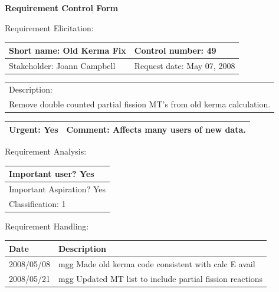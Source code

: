\begin{center}\Large\bf
Requirement Control Form
\end{center}
\vspace{24pt}

Requirement Elicitation:

\begin{tabular}{|p{211pt}|p{211pt}|} \hline
Short name: Old Kerma Fix & Control number: 49\\ \hline
Stakeholder: Joann Campbell & Request date: May 07, 2008\\
\end{tabular}
\begin{tabular}{|p{433pt}|} \hline
Description: \\ 
Remove double counted partial fission MT's from old kerma calculation.\\ 
\hline
\end{tabular} 
\begin{tabular}{|p{211pt}|p{211pt}|} \hline
Urgent: Yes & Comment: Affects many users of new data.\\ \hline
\end{tabular}

\vspace{24pt}

Requirement Analysis:

\begin{tabular}{|p{433pt}|} \hline
Important user? Yes \\ \hline
Important Aspiration? Yes \\ \hline
Classification: 1 \\ \hline
\end{tabular}

\vspace{24pt}

Requirement Handling:

\begin{tabular}{|p{72pt}|p{351pt}|} \hline
Date & Description \\ \hline
2008/05/08 & mgg Made old kerma code consistent with calc E avail \\
\hline
2008/05/21 & mgg Updated MT list to include partial fission reactions
\\ \hline
\end{tabular}
